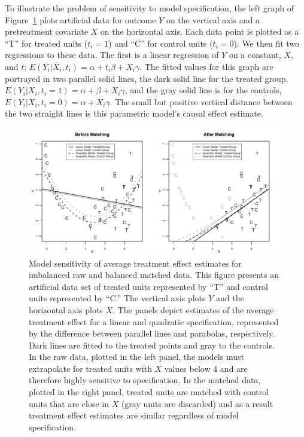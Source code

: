 \documentclass[11pt,titlepage]{article}
\begin{document}
To illustrate the problem of sensitivity to model specification, the
left graph of Figure~\ref{fg:extrap} plots artificial data for outcome
$Y$ on the vertical axis and a pretreatment covariate $X$ on the
horizontal axis.  Each data point is plotted as a ``T'' for treated
units ($t_i=1$) and ``C'' for control units ($t_i=0$).  We then fit
two regressions to these data.  The first is a linear regression of
$Y$ on a constant, $X$, and $t$: $E(Y_i|X_i,t_i)=\alpha + t_i\beta +
X_i\gamma$.  The fitted values for this graph are portrayed in two
parallel solid lines, the dark solid line for the treated group,
$E(Y_i|X_i,t_i=1)=\alpha+\beta+X_i\gamma$, and the gray solid line is
for the controls, $E(Y_i|X_i,t_i=0)=\alpha+X_i\gamma$. The small but
positive vertical distance between the two straight lines is this
parametric model's causal effect estimate.
\begin{figure}[t] 
 \begin{center}
   \includegraphics[width=6in]{figs/olspanel-thick.pdf}
  \end{center}
  \vspace{-0.275in}
  \caption{Model sensitivity of average treatment effect estimates for
    imbalanced raw and balanced matched data.  This figure presents an
    artificial data set of treated units represented by ``T'' and
    control units represented by ``C.'' The vertical axis plots $Y$
    and the horizontal axis plots $X$.  The panels depict estimates of
    the average treatment effect for a linear and quadratic
    specification, represented by the difference between parallel
    lines and parabolas, respectively.  Dark lines are fitted to the
    treated points and gray to the controls.  In the raw data, plotted
    in the left panel, the models must extrapolate for treated units
    with $X$ values below 4 and are therefore highly sensitive to
    specification.  In the matched data, plotted in the right panel,
    treated units are matched with control units that are close in $X$
    (gray units are discarded) and as a result treatment effect
    estimates are similar regardless of model specification.}
  \label{fg:extrap}
\end{figure}
\end{document}

